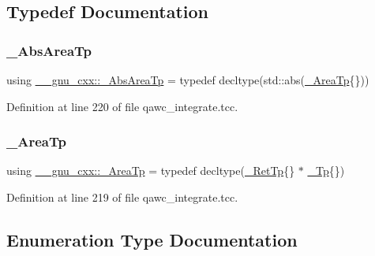 \subsection{Typedef Documentation}
\mbox{\label{namespace____gnu__cxx_a2f005089fd7e29a63d4165c56a5f4235}} 
\subsubsection{\texorpdfstring{\+\_\+\+Abs\+Area\+Tp}{\_AbsAreaTp}}
{\footnotesize\ttfamily using \hyperlink{namespace____gnu__cxx_a2f005089fd7e29a63d4165c56a5f4235}{\+\_\+\+\_\+gnu\+\_\+cxx\+::\+\_\+\+Abs\+Area\+Tp} = typedef decltype(std\+::abs(\hyperlink{namespace____gnu__cxx_ae97a51b75e19c30f48d27fac4664de6e}{\+\_\+\+Area\+Tp}\{\}))}



Definition at line 220 of file qawc\+\_\+integrate.\+tcc.

\mbox{\label{namespace____gnu__cxx_ae97a51b75e19c30f48d27fac4664de6e}} 
\subsubsection{\texorpdfstring{\+\_\+\+Area\+Tp}{\_AreaTp}}
{\footnotesize\ttfamily using \hyperlink{namespace____gnu__cxx_ae97a51b75e19c30f48d27fac4664de6e}{\+\_\+\+\_\+gnu\+\_\+cxx\+::\+\_\+\+Area\+Tp} = typedef decltype(\hyperlink{namespace____gnu__cxx_a886e03ece3d53ff7fa6c098a40f93fa5}{\+\_\+\+Ret\+Tp}\{\} $\ast$ \hyperlink{namespace____gnu__cxx_a3b19a9c800ca194374ef9172290f7d79}{\+\_\+\+Tp}\{\})}



Definition at line 219 of file qawc\+\_\+integrate.\+tcc.



\subsection{Enumeration Type Documentation}
\mbox{\label{namespace____gnu__cxx_ad6c62dd86a596716cece6ac2d4cfd4b3}} 
